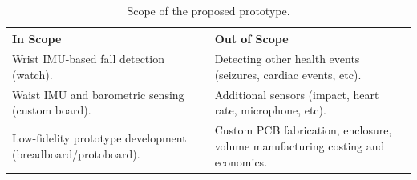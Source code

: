 
\begin{table}[!ht]
\centering
\scriptsize
\renewcommand{\arraystretch}{0.85}
\setlength{\tabcolsep}{3pt}
\caption{Scope of the proposed prototype.}
\label{tab:scope}
\begin{tabularx}{\linewidth}{@{}X X@{}}
\toprule
In Scope & Out of Scope \\
\midrule
Wrist IMU-based fall detection (watch). & Detecting other health events (seizures, cardiac events, etc). \\
\addlinespace
Waist IMU and barometric sensing (custom board). & Additional sensors (impact, heart rate, microphone, etc). \\
\addlinespace
Low-fidelity prototype development (breadboard/protoboard). & Custom PCB fabrication, enclosure, volume manufacturing costing and economics. \\
\bottomrule
\end{tabularx}
\end{table}